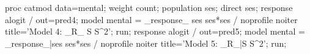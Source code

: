 \begin{listing}
proc catmod data=mental;
   weight count;
   population ses;
   direct ses;
   response alogit / out=pred4;
   model mental = _response_ ses ses*ses / noprofile noiter title='Model 4: _R_ S S^2';
  run;
   response alogit / out=pred5;
   model mental = _response_|ses ses*ses / noprofile noiter title='Model 5: _R_|S S^2';
  run;
\end{listing}
